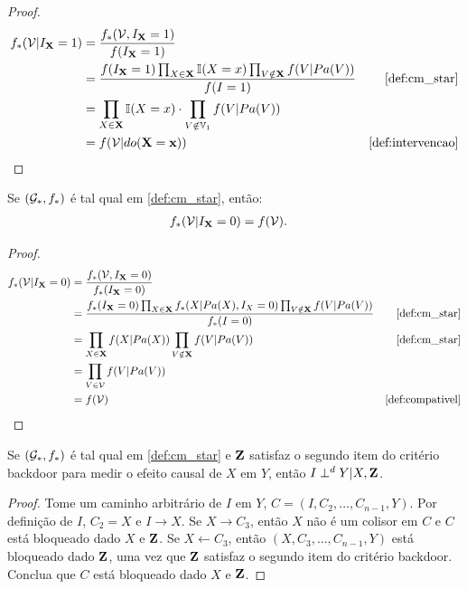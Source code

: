 \begin{proof}
 \begin{align*}
  f_*(\sV|I_{\X} = 1) 
  &= \frac{f_*(\sV, I_{\X}=1)}{f(I_{\X}=1)} \\
  &= \frac{f(I_{\X}=1)\prod_{X \in \X}\I(X = x)\prod_{V \notin \X}f(V|Pa(V))}{f(I=1)}
  & \text{\cref{def:cm_star}} \\
  &= \prod_{X \in \X}\I(X = x) \cdot \prod_{V \notin \V_1}f(V|Pa(V)) \\
  &= f(\sV|do(\X=\x)) 
  & \text{\cref{def:intervencao}}
 \end{align*}
\end{proof}

\begin{lemma}
 \label{lemma:backdoor_2}
 Se $({\mathcal G}_*, f_*)$ é tal qual em \cref{def:cm_star}, então:
 \begin{align*}
  f_*({\mathcal V}|I_{{\mathbf{X}}}=0) &= f({\mathcal V}).
 \end{align*}
\end{lemma}

\begin{proof}
 \begin{align*}
  f_*(\sV|I_{\X}=0) 
  &= \frac{f_*(\sV, I_{\X}=0)}{f_*(I_{\X}=0)} \\
  &= \frac{f_*(I_{\X}=0)\prod_{X \in \X}f_*(X|Pa(X),I_{X}=0)
  \prod_{V \notin \X} f(V|Pa(V))}{f_*(I=0)}
  & \text{\cref{def:cm_star}} \\
  &= \prod_{X \in \X}f(X|Pa(X))\prod_{V \notin \X} f(V|Pa(V))
  & \text{\cref{def:cm_star}} \\
  &= \prod_{V \in \sV} f(V|Pa(V)) \\
  &= f(\sV) 
  & \text{\cref{def:compativel}}
 \end{align*}
\end{proof}

\begin{lemma}
 \label{lemma:backdoor_3}
 Se $({\mathcal G}_*, f_*)$ é tal qual em \cref{def:cm_star} e
 ${\mathbf{Z}}$ satisfaz o segundo item do critério backdoor para
 medir o efeito causal de $X$ em $Y$, então $I \perp^d Y | X, {\mathbf{Z}}$.
\end{lemma}

\begin{proof}
 Tome um caminho arbitrário de
 $I$ em $Y$, $C = (I, C_2, \ldots, C_{n-1}, Y)$.
 Por definição de $I$, $C_2 = X$ e 
 $I \rightarrow X$. 
 Se $X \rightarrow C_3$, então
 $X$ não é um colisor em $C$ e 
 $C$ está bloqueado dado $X$ e ${\mathbf{Z}}$.
 Se $X \leftarrow C_3$, então
 $(X, C_3, \ldots, C_{n-1}, Y)$ está bloqueado
 dado ${\mathbf{Z}}$, uma vez que ${\mathbf{Z}}$ satisfaz
 o segundo item do critério backdoor.
 Conclua que $C$ está bloqueado dado $X$ e ${\mathbf{Z}}$.
\end{proof}

